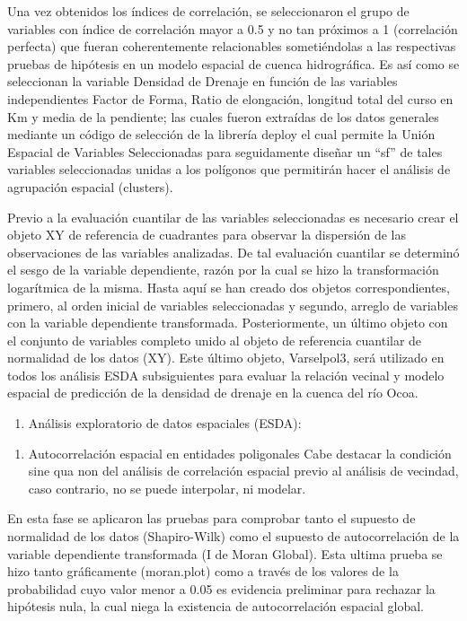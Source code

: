 \documentclass[11pt,]{article}
\providecommand{\tightlist}{%
\setlength{\itemsep}{0pt}\setlength{\parskip}{0pt}}
\begin{document}
Una vez obtenidos los índices de correlación, se seleccionaron el grupo
de variables con índice de correlación mayor a 0.5 y no tan próximos a 1
(correlación perfecta) que fueran coherentemente relacionables
sometiéndolas a las respectivas pruebas de hipótesis en un modelo
espacial de cuenca hidrográfica. Es así como se seleccionan la variable
Densidad de Drenaje en función de las variables independientes Factor de
Forma, Ratio de elongación, longitud total del curso en Km y media de la
pendiente; las cuales fueron extraídas de los datos generales mediante
un código de selección de la librería deploy el cual permite la Unión
Espacial de Variables Seleccionadas para seguidamente diseñar un ``sf''
de tales variables seleccionadas unidas a los polígonos que permitirán
hacer el análisis de agrupación espacial (clusters).

Previo a la evaluación cuantilar de las variables seleccionadas es
necesario crear el objeto XY de referencia de cuadrantes para observar
la dispersión de las observaciones de las variables analizadas. De tal
evaluación cuantilar se determinó el sesgo de la variable dependiente,
razón por la cual se hizo la transformación logarítmica de la misma.
Hasta aquí se han creado dos objetos correspondientes, primero, al orden
inicial de variables seleccionadas y segundo, arreglo de variables con
la variable dependiente transformada. Posteriormente, un último objeto
con el conjunto de variables completo unido al objeto de referencia
cuantilar de normalidad de los datos (XY). Este último objeto,
Varselpol3, será utilizado en todos los análisis ESDA subsiguientes para
evaluar la relación vecinal y modelo espacial de predicción de la
densidad de drenaje en la cuenca del río Ocoa.

\begin{enumerate}
\def\labelenumi{\Roman{enumi}.}
\setcounter{enumi}{1}
\tightlist
\item
  Análisis exploratorio de datos espaciales (ESDA):
\end{enumerate}

\begin{enumerate}
\def\labelenumi{\arabic{enumi}.}
\tightlist
\item
  Autocorrelación espacial en entidades poligonales Cabe destacar la
  condición sine qua non del análisis de correlación espacial previo al
  análisis de vecindad, caso contrario, no se puede interpolar, ni
  modelar.
\end{enumerate}

En esta fase se aplicaron las pruebas para comprobar tanto el supuesto
de normalidad de los datos (Shapiro-Wilk) como el supuesto de
autocorrelación de la variable dependiente transformada (I de Moran
Global). Esta ultima prueba se hizo tanto gráficamente (moran.plot) como
a través de los valores de la probabilidad cuyo valor menor a 0.05 es
evidencia preliminar para rechazar la hipótesis nula, la cual niega la
existencia de autocorrelación espacial global.
\end{document}
